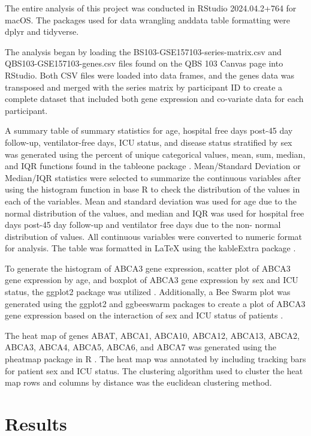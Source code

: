 \documentclass{article}
\begin{document}
The entire analysis of this project was conducted in RStudio 2024.04.2+764 for macOS. The packages used for data wrangling anddata table formatting were dplyr and tidyverse\cite{Dplyr}\cite{TidyVerse}. 

The analysis began by loading the BS103-GSE157103-series-matrix.csv and QBS103-GSE157103-genes.csv files found on the QBS 103 Canvas page into RStudio. Both CSV files were loaded into data frames, and the genes data was transposed and merged with the series matrix by participant ID to create a complete dataset that included both gene expression and co-variate data for each participant.

A summary table of summary statistics for age, hospital free days post-45 day follow-up, ventilator-free days, ICU status, and disease status stratified by sex was generated using the percent of unique categorical values, mean, sum, median, and IQR functions found in the tableone package \cite{TableOne}. Mean/Standard Deviation or Median/IQR statistics were selected to summarize the continuous variables after using the histogram function in base R to check the distribution of the values in each of the variables. Mean and standard deviation was used for age due to the normal distribution of the values, and median and IQR was used for hospital free days post-45 day follow-up and ventilator free days due to the non- normal distribution of values. All continuous variables were converted to numeric format for analysis. The table was formatted in LaTeX using the kableExtra package \cite{Kable}.

To generate the histogram of ABCA3 gene expression, scatter plot of ABCA3 gene expression by age, and boxplot of ABCA3 gene expression by sex and ICU status, the ggplot2 package was utilized \cite{ggplot2}. Additionally, a Bee Swarm plot was generated using the ggplot2 and ggbeeswarm packages to create a plot of ABCA3 gene expression based on the interaction of sex and ICU status of patients \cite{BeeSwarm}.

The heat map of genes ABAT, ABCA1, ABCA10, ABCA12, ABCA13, ABCA2, ABCA3, ABCA4, ABCA5, ABCA6, and ABCA7 was generated using the pheatmap package in R \cite{Pheatmap}. The heat map was annotated by including tracking bars for patient sex and ICU status. The clustering algorithm used to cluster the heat map rows and columns by distance was the euclidean clustering method. 

\section{Results}
\end{document}
